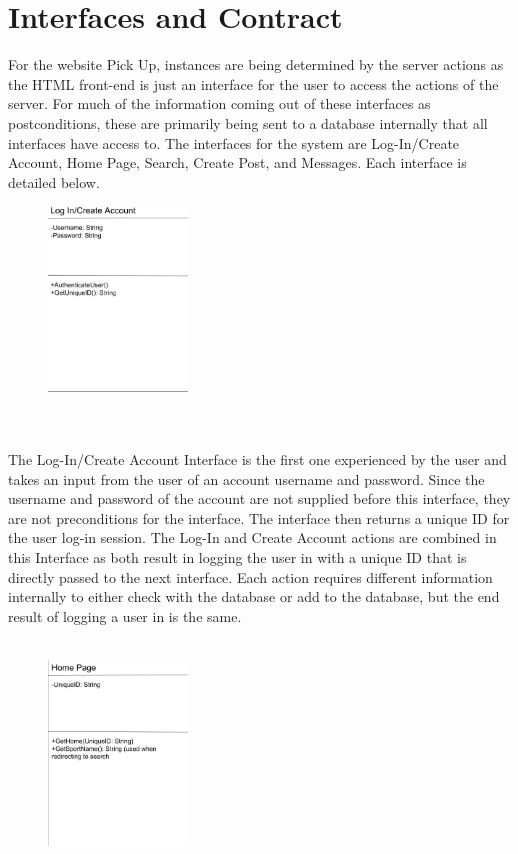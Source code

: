 \documentclass[a4paper]{article}
\begin{document}
\newpage

\section{Interfaces and Contract}

For the website Pick Up, instances are being determined by the server actions as the HTML front-end is just an interface for the user to access the actions of the server.
 For much of the information coming out of these interfaces as postconditions, these are primarily being sent to a database internally that all interfaces have access to.
 The interfaces for the system are Log-In/Create Account, Home Page, Search, Create Post, and Messages. Each interface is detailed below.
\begin{figure}
   \centering
   \includegraphics[width=0.33\textwidth]{LogIn.eps}
\end{figure}\\
\\
The Log-In/Create Account Interface is the first one experienced by the user and takes an input from the user of an account username and password. 
Since the username and password of the account are not supplied before this interface, they are not preconditions for the interface. 
The interface then returns a unique ID for the user log-in session. 
The Log-In and Create Account actions are combined in this Interface as both result in logging the user in with a unique ID that is directly passed to the next interface. 
Each action requires different information internally to either check with the database or add to the database, but the end result of logging a user in is the same.\\
\\
\begin{figure}
   \centering
   \includegraphics[width=0.33\textwidth]{HomePage.eps}
\end{figure}
\end{document}
